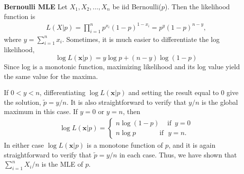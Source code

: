 \begin{exmp}\textbf{Bernoulli MLE}
Let $X_1,X_2,\dots,X_n$ be iid Bernoulli($p$). Then the likelihood function is
\begin{align}
L(X|p)=\prod\limits_{i=1}^n p^{x_i}(1-p)^{1-x_i}=p^{y}(1-p)^{n-y},
\end{align} 
where ${y}=\sum_{i=1}^n x_i$. Sometimes, it is much easier to differentiate the log likelihood, 
\begin{equation}
\log L(\textbf{x}|p)={y}\log p + (n-{y}	)\log (1-p)
\end{equation}
Since log is a monotonic function, maximizing likelihood and its log value yield the same value for the maxima.
\par If $0<y<n$, differentiating $\log L(\textbf{x}|p)$ and setting the result equal to $0$ give the solution, $\tilde{p}=y/n$. It is also straightforward to verify that $y/n$ is the global maximum in this case. If $y=0$ or $y=n$, then
\begin{align}
\log L(\textbf{x}|p) = 
\begin{cases}
n\log(1-p)\,\,\,\,\,\,\,\mbox{if}\,\,\, y=0\\
n\log p\,\,\,\,\,\,\,\,\,\,\,\,\,\,\,\,\,\,\,\,\,\mbox{if}\,\,\,\, y=n.
\end{cases}
\end{align}
In either case $\log L(\textbf{x}|p)$ is a monotone function of $p$, and it is again straightforward to verify that $\tilde{p}=y/n$  in each case. Thus, we have shown that $\sum_{i=1}^n {X_i}/n$  is the MLE of $p$.
\end{exmp}
